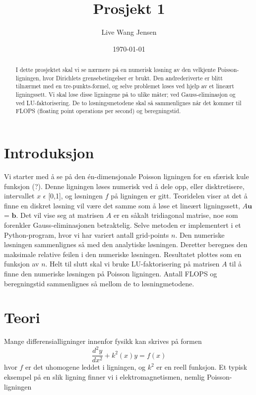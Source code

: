 \documentclass{article}
\title{Prosjekt 1}
\author{Live Wang Jensen}
\date{\today}
\begin{document}
\maketitle


\begin{abstract}
I dette prosjektet skal vi se nærmere på en numerisk løsning av den velkjente Poisson-ligningen, hvor Dirichlets grensebetingelser er brukt. Den andrederiverte er blitt tilnærmet med en tre-punkts-formel, og selve problemet løses ved hjelp av et lineært ligningssett. Vi skal løse disse ligningene på to ulike måter; ved Gauss-eliminasjon og ved LU-faktorisering. De to løsningsmetodene skal så sammenlignes når det kommer til FLOPS (floating point operations per second) og beregningstid.

\end{abstract}

\section{Introduksjon}
Vi starter med å se på den én-dimensjonale Poisson ligningen for en sfærisk kule funksjon (?). Denne ligningen løses numerisk ved å dele opp, eller disktretisere, intervallet $x$ $\epsilon$ [0,1], og løsningen $f$ på ligningen er gitt. Teoridelen viser at det å finne en diskret løsning vil være det samme som å løse et lineært ligningssett, $A\textbf{u}$ = $\textbf{\~b}$. Det vil vise seg at matrisen $A$ er en såkalt tridiagonal matrise, noe som forenkler Gauss-eliminasjonen betraktelig. Selve metoden er implementert i et Python-program, hvor vi har variert antall grid-points $n$. Den numeriske løsningen sammenlignes så med den analytiske løsningen. Deretter beregnes den maksimale relative feilen i den numeriske løsningen. Resultatet plottes som en funksjon av $n$. Helt til slutt skal vi bruke LU-faktorisering på matrisen $A$ til å finne den numeriske løsningen på Poisson ligningen. Antall FLOPS og beregningstid sammenlignes så mellom de to løsningmetodene.

\section{Teori}
Mange differensialligninger innenfor fysikk kan skrives på formen
\begin{equation}
\frac{d^2y}{dx^2} + k^2(x)y = f(x)
\end{equation}
hvor $f$ er det uhomogene leddet i ligningen, og $k^2$ er en reell funksjon. Et typisk eksempel på en slik ligning finner vi i elektromagnetismen, nemlig Poisson-ligningen
\end{document}
